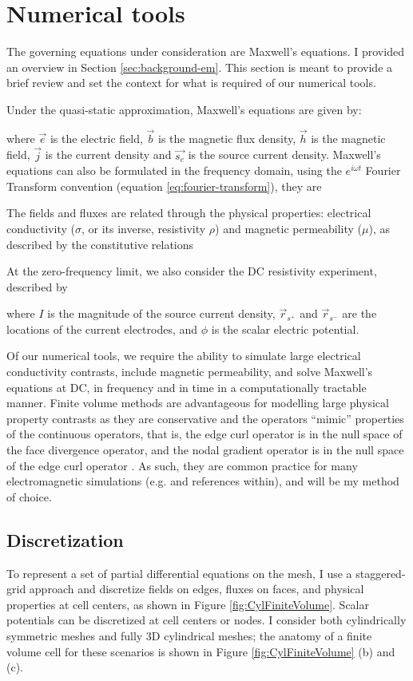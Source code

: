 \section{Numerical tools}
\label{sec:numerical_tools}

The governing equations under consideration are Maxwell's equations. I provided an overview in Section \ref{sec:background-em}. This section is meant to provide a brief review and set the context for what is required of our numerical tools.

Under the quasi-static approximation, Maxwell's equations are given by:

where $\vec{e}$ is the electric field, $\vec{b}$ is the magnetic flux density, $\vec{h}$ is the magnetic field, $\vec{j}$ is the current density and $\vec{s_e}$ is the source current density. Maxwell's equations can also be formulated in the frequency domain, using the $e^{i \omega t}$ Fourier Transform convention (equation \ref{eq:fourier-transform}), they are

The fields and fluxes are related through the physical properties: electrical conductivity ($\sigma$, or its inverse, resistivity $\rho$) and magnetic permeability ($\mu$), as described by the constitutive relations

At the zero-frequency limit, we also consider the DC resistivity experiment, described by

where $I$ is the magnitude of the source current density, $\vec{r}_{s^+}$ and $\vec{r}_{s^-}$ are the locations of the current electrodes, and $\phi$ is the scalar electric potential.

Of our numerical tools, we require the ability to simulate large electrical conductivity contrasts, include magnetic permeability, and solve Maxwell's equations at DC, in frequency and in time in a computationally tractable manner. Finite volume methods are advantageous for modelling large physical property contrasts as they are conservative and the operators ``mimic'' properties of the continuous operators, that is, the edge curl operator is in the null space of the face divergence operator, and the nodal gradient operator is in the null space of the edge curl operator \citep{Hyman1999}. As such, they are common practice for many electromagnetic simulations (e.g. \cite{Horesh2011, Haber2014, Jahandari2014} and references within), and will be my method of choice.
\subsection{Discretization}
To represent a set of partial differential equations on the mesh, I use a staggered-grid approach \citep{Yee1966} and discretize fields on edges, fluxes on faces, and physical properties at cell centers, as shown in Figure \ref{fig:CylFiniteVolume}. Scalar potentials can be discretized at cell centers or nodes. I consider both cylindrically symmetric meshes and fully 3D cylindrical meshes; the anatomy of a finite volume cell for these scenarios is shown in Figure \ref{fig:CylFiniteVolume} (b) and (c).


